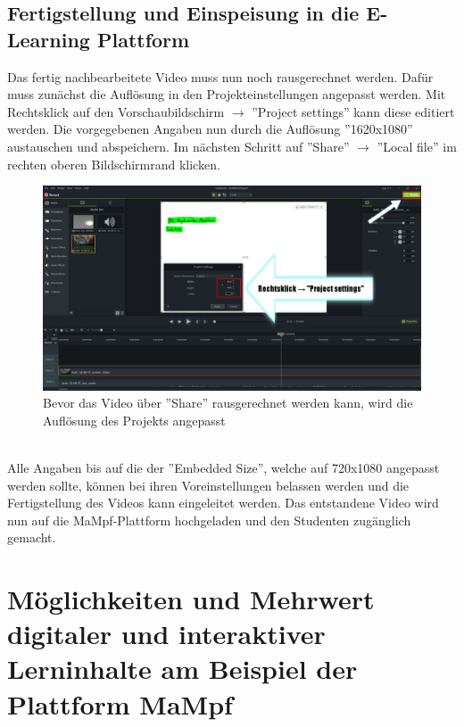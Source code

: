 \documentclass{scrreprt}
\begin{document}
\section{Fertigstellung und Einspeisung in die E-Learning Plattform}
Das fertig nachbearbeitete Video muss nun noch rausgerechnet werden. Dafür muss zunächst die Auflösung in den Projekteinstellungen angepasst werden. Mit Rechtsklick auf den Vorschaubildschirm $\rightarrow$ ''Project settings'' kann diese editiert werden. Die vorgegebenen Angaben nun durch die Auflösung ''1620x1080'' austauschen und abspeichern. Im nächsten Schritt auf ''Share'' $\rightarrow$ ''Local file'' im rechten oberen Bildschirmrand klicken.
\begin{figure}[h]
    \centering
    \includegraphics[width=1\textwidth]{render.png}
    \caption{Bevor das Video über ''Share'' rausgerechnet werden kann, wird die Auflösung des Projekts angepasst}
    \label{fig:render}
\end{figure}
\\
Alle Angaben bis auf die der ''Embedded Size'', welche auf 720x1080 angepasst werden sollte, können bei ihren Voreinstellungen belassen werden und die Fertigstellung des Videos kann eingeleitet werden. Das entstandene Video wird nun auf die MaMpf-Plattform hochgeladen und den Studenten zugänglich gemacht. 

\chapter{Möglichkeiten und Mehrwert digitaler und interaktiver Lerninhalte am Beispiel der Plattform MaMpf}
\end{document}

